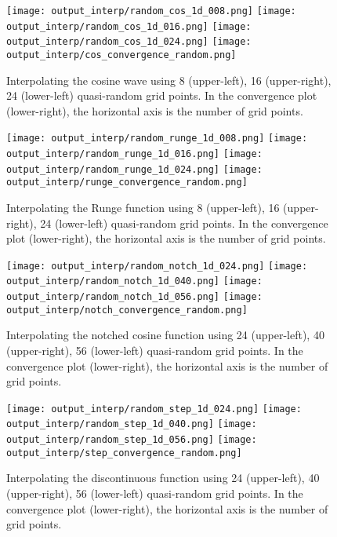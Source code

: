 \clearpage
\begin{figure}[tb!] \centering
\texttt{[image: output\_interp/random\_cos\_1d\_008.png]}
\texttt{[image: output\_interp/random\_cos\_1d\_016.png]}
\texttt{[image: output\_interp/random\_cos\_1d\_024.png]}
\texttt{[image: output\_interp/cos\_convergence\_random.png]}
\caption{Interpolating the cosine wave using 8 (upper-left),
         16 (upper-right), 24 (lower-left) quasi-random grid points.
         In the convergence plot (lower-right), the horizontal axis is the
         number of grid points.}
\label{interp_cos_random}
\end{figure}

\begin{figure}[tb!] \centering
\texttt{[image: output\_interp/random\_runge\_1d\_008.png]}
\texttt{[image: output\_interp/random\_runge\_1d\_016.png]}
\texttt{[image: output\_interp/random\_runge\_1d\_024.png]}
\texttt{[image: output\_interp/runge\_convergence\_random.png]}
\caption{Interpolating the Runge function using 8 (upper-left),
         16 (upper-right), 24 (lower-left) quasi-random grid points.
         In the convergence plot (lower-right), the horizontal axis is the
         number of grid points.}
\label{interp_runge_random}
\end{figure}

\clearpage
\begin{figure}[tb!] \centering
\texttt{[image: output\_interp/random\_notch\_1d\_024.png]}
\texttt{[image: output\_interp/random\_notch\_1d\_040.png]}
\texttt{[image: output\_interp/random\_notch\_1d\_056.png]}
\texttt{[image: output\_interp/notch\_convergence\_random.png]}
\caption{Interpolating the notched cosine function using 24 (upper-left),
         40 (upper-right), 56 (lower-left) quasi-random grid points.
         In the convergence plot (lower-right), the horizontal axis is the
         number of grid points.}
\label{interp_notch_random}
\end{figure}

\begin{figure}[tb!] \centering
\texttt{[image: output\_interp/random\_step\_1d\_024.png]}
\texttt{[image: output\_interp/random\_step\_1d\_040.png]}
\texttt{[image: output\_interp/random\_step\_1d\_056.png]}
\texttt{[image: output\_interp/step\_convergence\_random.png]}
\caption{Interpolating the discontinuous function using 24 (upper-left),
         40 (upper-right), 56 (lower-left) quasi-random grid points.
         In the convergence plot (lower-right), the horizontal axis is the
         number of grid points.}
\label{interp_step_random}
\end{figure}

